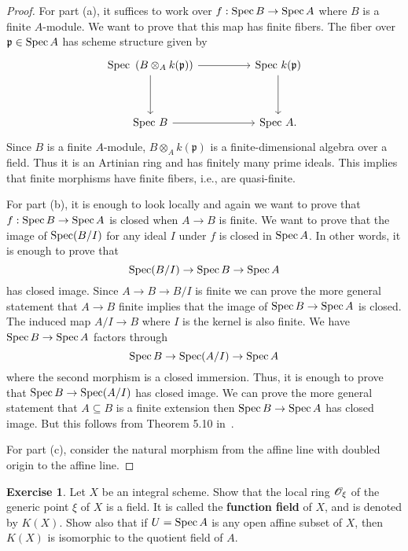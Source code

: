 \documentclass[]{pcmi}
\theoremstyle{plain}
\theoremstyle{definition}
\newtheorem{Exercise}[subsubsection]{Exercise}
\theoremstyle{remark}
\begin{document}
\begin{proof}
    For part (a), it suffices to work over $f : \operatorname{Spec} B \to \operatorname{Spec} A$ where $B$ is a finite $A$-module. We want to prove that this map has finite fibers. The fiber over $\mathfrak{p} \in \operatorname{Spec} A$ has scheme structure given by 
    \[
        \begin{tikzcd}
            {\text{Spec } \left ( B \otimes_A k(\mathfrak{p}) \right )} && {\text{Spec } k(\mathfrak{p})} \\
            \\
            {\text{Spec } B} && {\text{Spec } A}
            \arrow[from=1-1, to=1-3]
            \arrow[from=1-1, to=3-1]
            \arrow[from=1-3, to=3-3]
            \arrow[from=3-1, to=3-3].
        \end{tikzcd}
    \]
    Since $B$ is a finite $A$-module, $B \otimes_A k(\mathfrak{p})$ is a finite-dimensional algebra over a field. Thus it is an Artinian ring and has finitely many prime ideals. This implies that finite morphisms have finite fibers, i.e., are quasi-finite. 

    For part (b), it is enough to look locally and again we want to prove that $f : \operatorname{Spec} B \to \operatorname{Spec} A$ is closed when $A \to B$ is finite. We want to prove that the image of $\operatorname{Spec} (B/I)$ for any ideal $I$ under $f$ is closed in $\operatorname{Spec} A$. In other words, it is enough to prove that 
    \[
        \operatorname{Spec} (B/I) \to \operatorname{Spec} B \to \operatorname{Spec} A
    \]
    has closed image. Since $A \to B \to B/I$ is finite we can prove the more general statement that $A \to B$ finite implies that the image of $\operatorname{Spec} B \to \operatorname{Spec} A$ is closed. The induced map $A / I \to B$ where $I$ is the kernel is also finite. We have $\operatorname{Spec} B \to \operatorname{Spec} A$ factors through 
    \[
        \operatorname{Spec} B \to \operatorname{Spec} (A/I) \to \operatorname{Spec} A
    \]
    where the second morphism is a closed immersion. Thus, it is enough to prove that $\operatorname{Spec} B \to \operatorname{Spec} (A/I)$ has closed image. We can prove the more general statement that $A \subseteq B$ is a finite extension then $\operatorname{Spec} B \to \operatorname{Spec} A$ has closed image. But this follows from Theorem 5.10 in~\cite{Atiyah1969}.
    
    For part (c), consider the natural morphism from the affine line with doubled origin to the affine line. 
\end{proof}

\begin{Exercise}
    Let $X$ be an integral scheme. Show that the local ring $\mathscr{O}_\xi$ of the generic point $\xi$ of $X$ is a field. It is called the \textbf{function field} of $X$, and is denoted by $K(X)$. Show also that if $U = \operatorname{Spec} A$ is any open affine subset of $X$, then $K(X)$ is isomorphic to the quotient field of $A$. 
\end{Exercise}
\end{document}
